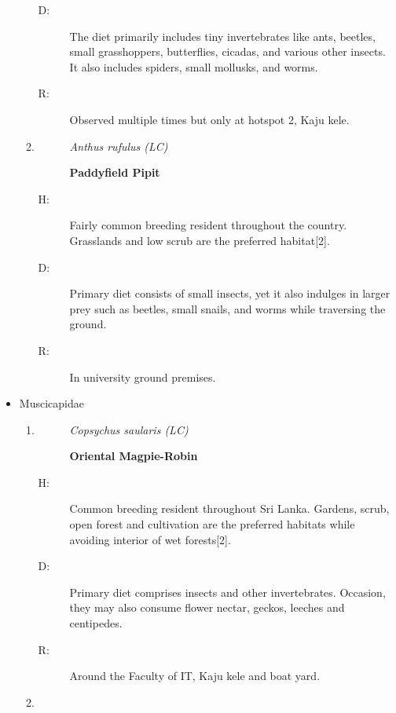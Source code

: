 \begin{itemize}
\begin{enumerate}
\begin{description}
\item[D: ]%
The diet primarily includes tiny invertebrates like ants, beetles, small grasshoppers, butterflies, cicadas, and various other insects. It also includes spiders, small mollusks, and worms.%
\item[R: ]%
Observed multiple times but only at hotspot 2, Kaju kele.%
\end{description}%
\item%
\begin{description}%
\item[]%
\textit{Anthus rufulus (LC)}%
\item[]%
\textbf{Paddyfield Pipit}%
\end{description}%
\begin{description}%
\item[H: ]%
Fairly common breeding resident throughout the country. Grasslands and low scrub are the preferred habitat{[}2{]}.%
\item[D: ]%
Primary diet consists of small insects, yet it also indulges in larger prey such as beetles, small snails, and worms while traversing the ground. %
\item[R: ]%
In university ground premises.%
\end{description}%
\end{enumerate}%
\item%
Muscicapidae%
\begin{enumerate}%
\item%
\begin{description}%
\item[]%
\textit{Copsychus saularis (LC)}%
\item[]%
\textbf{Oriental Magpie{-}Robin}%
\end{description}%
\begin{description}%
\item[H: ]%
Common breeding resident throughout Sri Lanka. Gardens, scrub, open forest and cultivation are the preferred habitats while avoiding interior of wet forests{[}2{]}.%
\item[D: ]%
Primary diet comprises insects and other invertebrates. Occasion, they may also consume flower nectar, geckos, leeches and centipedes.%
\item[R: ]%
Around the Faculty of IT, Kaju kele and boat yard.%
\end{description}%
\item%
\begin{description}%
\item[]%

\end{description}
\end{enumerate}
\end{itemize}

